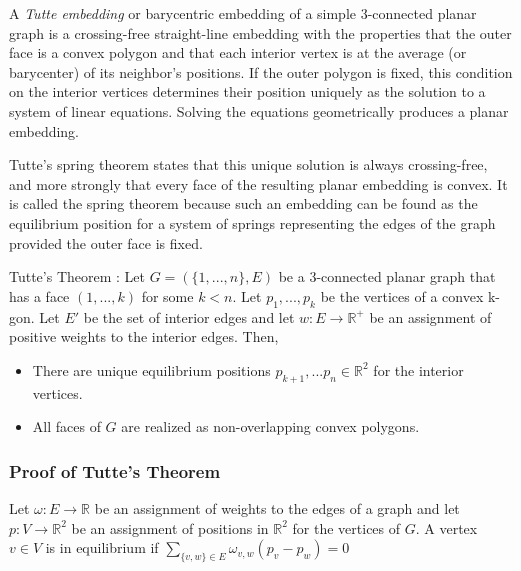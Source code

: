 \documentclass[11pt]{article}
\newcommand{\R}{\mathbb{R}}
\begin{document}
  A \emph{Tutte embedding} or barycentric embedding of a simple 3-connected planar graph is a crossing-free straight-line embedding with the properties that the outer face is a convex polygon and that each interior vertex is at the average (or barycenter) of its neighbor's positions. If the outer polygon is fixed, this condition on the interior vertices determines their position uniquely as the solution to a system of linear equations. Solving the equations geometrically produces a planar embedding. 
  
  Tutte's spring theorem states that this unique solution is always crossing-free, and more strongly that every face of the resulting planar embedding is convex. It is called the spring theorem because such an embedding can be found as the equilibrium position for a system of springs representing the edges of the graph provided the outer face is fixed.
 
 Tutte's Theorem \cite{realizationSpaces}: Let $G = (\{1,...,n\},E)$ be a 3-connected planar graph that has a face $(1,...,k)$ for some $k<n$. Let $p_1,...,p_k$ be the vertices of a convex k-gon. Let $E'$ be the set of interior edges and let $w : E \rightarrow \R^+$ be an assignment of positive weights to the interior edges. Then,
 	\begin{itemize}
		\item There are unique equilibrium positions $p_{k+1}, ...p_n \in \R^2$ for the interior vertices. 
		\item All faces of $G$ are realized as non-overlapping convex polygons.
	\end{itemize}
	
\subsubsection{Proof of Tutte's Theorem}
Let $\omega : E \rightarrow \R$ be an assignment of weights to the edges of a graph and let $p:V \rightarrow \R^2$ be an assignment of positions in $\R^2$ for the vertices of $G$. A vertex $v \in V$ is in equilibrium if  $\sum\limits_{\{v,w\} \in E} \omega_{v,w}(p_v - p_w) = 0$
\end{document}
